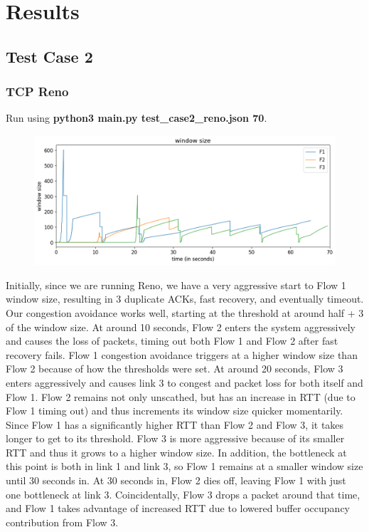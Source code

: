 \documentclass{article}
\begin{document}
\section{Results}

\subsection{Test Case 2}

\subsubsection{TCP Reno}

Run using \textbf{python3 main.py test\_case2\_reno.json 70}.

\begin{figure}[H]
\centering
\includegraphics[width = \textwidth]{"test_case2_reno window size"}
\end{figure}

Initially, since we are running Reno, we have a very aggressive start to Flow 1 window size, resulting in 3 duplicate ACKs, fast recovery, and eventually timeout. Our congestion avoidance works well, starting at the threshold at around half + 3 of the window size. At around 10 seconds, Flow 2 enters the system aggressively and causes the loss of packets, timing out both Flow 1 and Flow 2 after fast recovery fails. Flow 1 congestion avoidance triggers at a higher window size than Flow 2 because of how the thresholds were set. At around 20 seconds, Flow 3 enters aggressively and causes link 3 to congest and packet loss for both itself and Flow 1. Flow 2 remains not only unscathed, but has an increase in RTT (due to Flow 1 timing out) and thus increments its window size quicker momentarily. Since Flow 1 has a significantly higher RTT than Flow 2 and Flow 3, it takes longer to get to its threshold. Flow 3 is more aggressive because of its smaller RTT and thus it grows to a higher window size. In addition, the bottleneck at this point is both in link 1 and link 3, so Flow 1 remains at a smaller window size until 30 seconds in. At 30 seconds in, Flow 2 dies off, leaving Flow 1 with just one bottleneck at link 3. Coincidentally, Flow 3 drops a packet around that time, and Flow 1 takes advantage of increased RTT due to lowered buffer occupancy contribution from Flow 3. 
\end{document}
